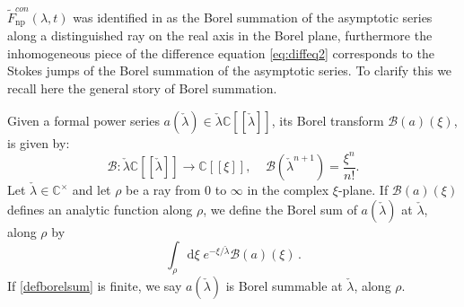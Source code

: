 \documentclass[a4paper,12pt,justification=centering]{article}
\numberwithin{equation}{section}
\theoremstyle{plain}%
\theoremstyle{definition}
\begin{document}
$\widetilde{F}^{con}_{\text{np}}(\lambda,t)$  was identified in \cite{Alim:2021mhp} as the Borel summation of the asymptotic series along a distinguished ray on the real axis in the Borel plane, furthermore the inhomogeneous piece of the difference equation  \eqref{eq:diffeq2} corresponds to the Stokes jumps of the Borel summation of the asymptotic series. To clarify this we recall here the general story of Borel summation.

Given a formal power series $a(\check{\lambda}) \in \check{\lambda}\mathbb{C}[[\check{\lambda}]]$, its Borel transform $\mathcal{B}(a)(\xi)$, is given by:
\begin{equation}
    \mathcal{B}\colon\check{\lambda}\mathbb{C}[[\check{\lambda}]]\to \mathbb{C}[[\xi]], \;\;\;\; \mathcal{B}(\check{\lambda}^{n+1})=\frac{\xi^n}{n!}.
\end{equation}
Let $\check{\lambda}\in \mathbb{C}^{\times}$ and let $\rho$ be a ray from $0$ to $\infty$ in the complex $\xi$-plane. If $\mathcal{B}(a)(\xi)$ defines an analytic function along $\rho$, we define the Borel sum of $a(\check{\lambda})$ at $\check{\lambda}$, along $\rho$ by 
\begin{equation}\label{defborelsum}
    \int_{\rho}\mathrm d\xi \;e^{-\xi/\check{\lambda}}\mathcal{B}(a)(\xi)\,.
\end{equation}
If \eqref{defborelsum} is finite, we say $a(\check{\lambda})$ is Borel summable at $\check{\lambda}$, along $\rho$.
\end{document}
